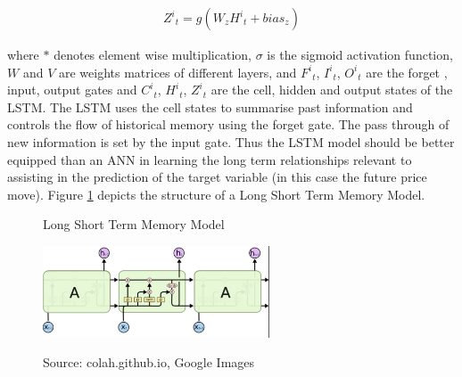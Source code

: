 \documentclass[11pt]{article}
\begin{document}
\begin{align}
{Z^{i}}_{t} = g(W_{z}{H^{i}}_{t} + bias_{z})
\end{align}

where $*$ denotes element wise multiplication, $\sigma$ is the sigmoid activation function, $W$ and $V$ are weights matrices of different layers, and ${F^{i}}_{t}$, ${I^{i}}_{t}$, ${O^{i}}_{t}$ are the forget , input, output gates and ${C^{i}}_{t} $, ${H^{i}}_{t}$, ${Z^{i}}_{t}$ are the cell,  hidden and output states of the LSTM. The LSTM uses the cell states to summarise past information and controls the flow of historical memory using the forget gate. The pass through of new information is set by the input gate. Thus the LSTM model should be better equipped than an ANN in learning the long term relationships relevant to assisting in the prediction of the target variable (in this case the future price move). Figure \ref{fig:LSTM_arch} depicts the structure of a Long Short Term Memory Model. 

\begin{figure}[h]
    \centering
	\caption{Long Short Term Memory Model}    
	\includegraphics[width=0.6\textwidth]{LSTM_arch}
    \label{fig:LSTM_arch}
     \caption*{\small Source: colah.github.io, Google Images}
\end{figure}
 
\end{document}
